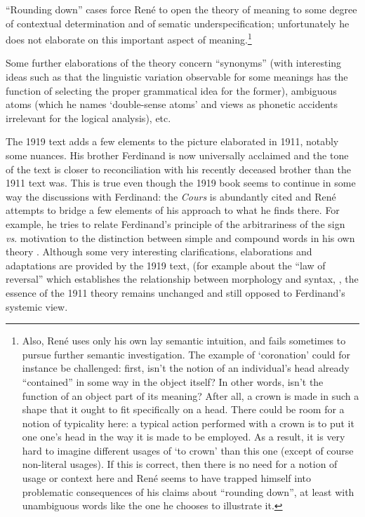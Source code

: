 \documentclass[output=paper]{langsci/langscibook}
\begin{document}
``Rounding down'' cases force René to open the theory of meaning to some
degree of contextual determination and of sematic underspecification;
unfortunately he does not elaborate on this important aspect of
meaning.\footnote{Also, René uses only his own lay semantic intuition,
  and fails sometimes to pursue further semantic investigation. The
  example of ‘coronation’ could for instance be challenged: first,
  isn’t the notion of an individual’s head already ``contained'' in some
  way in the object itself? In other words, isn’t the function of an
  object part of its meaning? After all, a crown is made in such a
  shape that it ought to fit specifically on a head. There could be
  room for a notion of typicality here: a typical action performed
  with a crown is to put it one one’s head in the way it is made to be
  employed. As a result, it is very hard to imagine different usages
  of ‘to crown’ than this one (except of course non-literal
  usages). If this is correct, then there is no need for a notion of
  usage or context here and René seems to have trapped himself into
  problematic consequences of his claims about ``rounding down'', at
  least with unambiguous words like the one he chooses to illustrate
  it.}

Some further elaborations of the theory concern ``synonyms'' (with
interesting ideas such as that the linguistic variation observable for
some meanings has the function of selecting the proper grammatical
idea for the former), ambiguous atoms (which he names ‘double-sense
atoms’ and views as phonetic accidents irrelevant for the logical
analysis), etc.

The 1919 text adds a few elements to the picture elaborated in 1911,
notably some nuances. His brother Ferdinand is now universally
acclaimed and the tone of the text is closer to reconciliation with
his recently deceased brother than the 1911 text was. This is true
even though the 1919 book seems to continue in some way the
discussions with Ferdinand: the \textsl{Cours} is abundantly cited and
René attempts to bridge a few elements of his approach to what he finds
there. For example, he tries to relate Ferdinand’s principle of the
arbitrariness of the sign \emph{vs}. motivation to the distinction
between simple and compound words in his own theory
\citep[6]{r.desaussure19:structure.logique}.  Although some very
interesting clarifications, elaborations and adaptations are provided
by the 1919 text, (for example about the ``law of reversal'' which
establishes the relationship between morphology and syntax,
\citep[11]{r.desaussure19:structure.logique}, the essence of the
1911 theory remains unchanged and still opposed to Ferdinand’s
systemic view.
\end{document}
